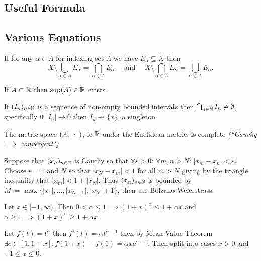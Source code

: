 \newpage
\begin{multicols}{2}
\section*{Useful Formula\vspace{-2ex}}
\subsection*{Various Equations\vspace{-1ex}}

\begin{theorem}
If for any $\alpha\in A$ for indexing set $A$ we have $E_\alpha\subseteq X$ then
    \[
    X\setminus\bigcup_{\alpha\in A} E_\alpha = \bigcap_{\alpha\in A} E_\alpha
    \quad\text{ and }\quad
    X\setminus\bigcap_{\alpha\in A} E_\alpha = \bigcup_{\alpha\in A} E_\alpha.
    \]
\end{theorem}

\begin{axiom}[Completeness]
If $A\subset\mathbb{R}$ then $\sup(A)\in\mathbb{R}$ exists.
\end{axiom}

\begin{theorem}
If $(I_n)_{n\in\mathbb{N}}$ is a sequence of non-empty bounded intervals then $\bigcap_{n\in\mathbb{N}}I_n\neq\emptyset$, specifically if $|I_n|\to0$ then $I_n\to\{x\}$, a singleton.
\end{theorem}

\begin{theorem}
The metric space $(\mathbb{R},|\cdot|)$, ie $\mathbb{R}$ under the Euclidean metric, is complete \textit{(``Cauchy $\implies$ convergent")}.
\end{theorem}
\begin{proof1}
Suppose that $(x_n)_{n\in\mathbb{N}}$ is Cauchy so that $\forall\varepsilon>0:\,\forall m,n>N:\, |x_m-x_n|<\varepsilon$. Choose $\varepsilon=1$ and $N$ so that $|x_N-x_m|<1$ for all $m>N$ giving by the triangle inequality that $|x_m|<1+|x_N|$. Thus $(x_n)_{n\in\mathbb{N}}$ is bounded by $M:=\max\{|x_1|,\dots,|x_{N-1}|,|x_N|+1\}$, then use Bolzano-Weierstrass.
\end{proof1}

\begin{theorem}
Let $x\in[-1,\infty)$. Then $0<\alpha\leq 1\implies (1+x)^\alpha \leq 1 + \alpha x$  and
 $\alpha\geq1\implies(1+x)^\alpha \geq 1 + \alpha x$.
\end{theorem}
\begin{proof1}
Let $f(t)=t^\alpha$ then $f'(t)=\alpha t^{\alpha-1}$ then by Mean Value Theorem $\exists c\in[1,1+x]: f(1+x)-f(1)=\alpha xc^{\alpha-1}$. Then split into cases $x>0$ and $-1\leq x \leq 0$. 
\end{proof1}
\end{multicols}

